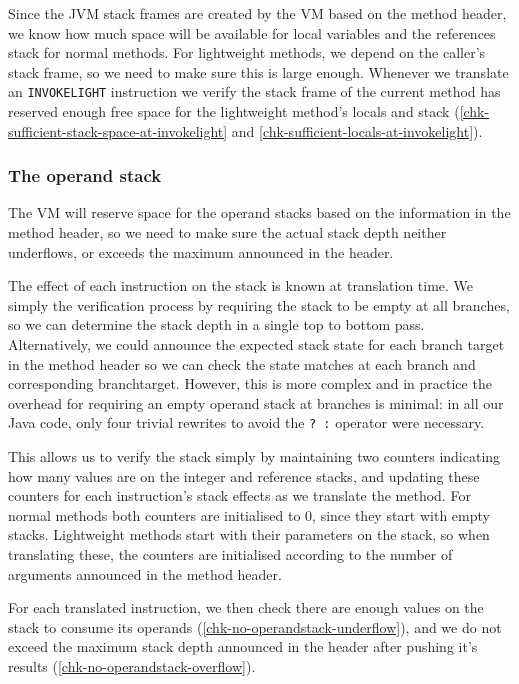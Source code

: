 Since the JVM stack frames are created by the VM based on the method header, we know how much space will be available for local variables and the references stack for normal methods. For lightweight methods, we depend on the caller's stack frame, so we need to make sure this is large enough. Whenever we translate an \texttt{INVOKELIGHT} instruction we verify the stack frame of the current method has reserved enough free space for the lightweight method's locals and stack (\ref{chk-sufficient-stack-space-at-invokelight} and \ref{chk-sufficient-locals-at-invokelight}).

\subsubsection{The operand stack}
The VM will reserve space for the operand stacks based on the information in the method header, so we need to make sure the actual stack depth neither underflows, or exceeds the maximum announced in the header.

The effect of each instruction on the stack is known at translation time. We simply the verification process by requiring the stack to be empty at all branches, so we can determine the stack depth in a single top to bottom pass. Alternatively, we could announce the expected stack state for each branch target in the method header so we can check the state matches at each branch and corresponding branchtarget. However, this is more complex and in practice the overhead for requiring an empty operand stack at branches is minimal: in all our Java code, only four trivial rewrites to avoid the \texttt{? :} operator were necessary.

This allows us to verify the stack simply by maintaining two counters indicating how many values are on the integer and reference stacks, and updating these counters for each instruction's stack effects as we translate the method. For normal methods both counters are initialised to 0, since they start with empty stacks. Lightweight methods start with their parameters on the stack, so when translating these, the counters are initialised according to the number of arguments announced in the method header.

For each translated instruction, we then check there are enough values on the stack to consume its operands (\ref{chk-no-operandstack-underflow}), and we do not exceed the maximum stack depth announced in the header after pushing it's results (\ref{chk-no-operandstack-overflow}).

